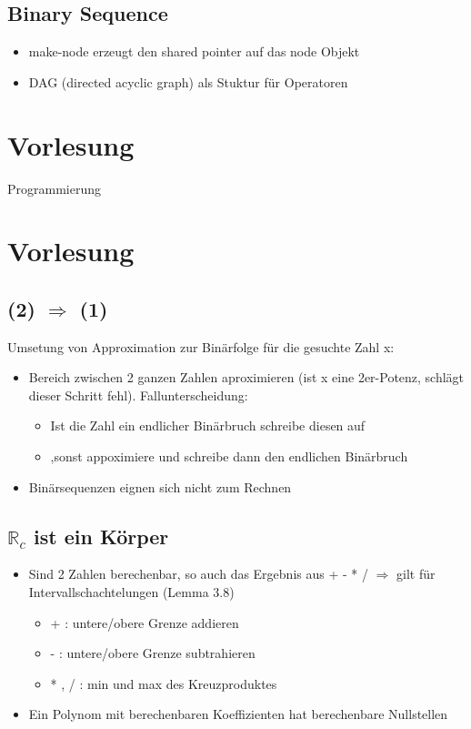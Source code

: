 \documentclass[ngerman]{scrartcl}
\begin{document}
\subsection{Binary Sequence}
\begin{itemize}
  \item make-node erzeugt den shared pointer auf das node Objekt
  \item DAG (directed acyclic graph) als Stuktur für Operatoren
\end{itemize}

\section{Vorlesung}
Programmierung


\section{Vorlesung}
\subsection{(2) $ \Rightarrow $ (1)}
Umsetung von Approximation zur Binärfolge für die gesuchte Zahl x:
\begin{itemize}
  \item Bereich zwischen 2 ganzen Zahlen aproximieren (ist x eine 2er-Potenz, schlägt dieser Schritt fehl). Fallunterscheidung:
  \begin{itemize}
    \item Ist die Zahl ein endlicher Binärbruch schreibe diesen auf
    \item ,sonst appoximiere und schreibe dann den endlichen Binärbruch
  \end{itemize}
  \item Binärsequenzen eignen sich nicht zum Rechnen
\end{itemize}

\subsection{$ \mathbb{R}_c $ ist ein Körper}
\begin{itemize}
  \item Sind 2 Zahlen berechenbar, so auch das Ergebnis aus + - * / $ \Rightarrow $ gilt für Intervallschachtelungen (Lemma 3.8)
  \begin{itemize}
    \item + : untere/obere Grenze addieren
    \item - : untere/obere Grenze subtrahieren
    \item * , / : min und max des Kreuzproduktes
  \end{itemize}
  \item Ein Polynom mit berechenbaren Koeffizienten hat berechenbare Nullstellen
\end{itemize}
\end{document}
